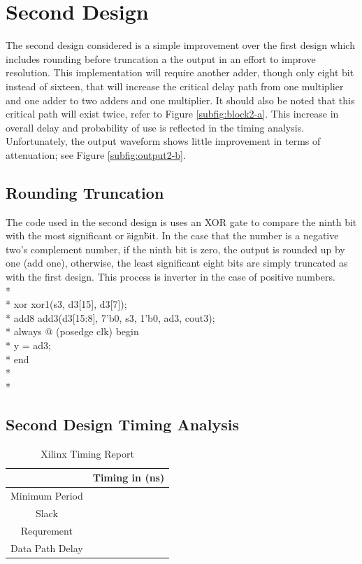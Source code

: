\section*{Second Design}
The second design considered is a simple improvement over the first design which includes rounding before truncation a the output in an effort to improve resolution. This implementation will require another adder, though only eight bit instead of sixteen, that will increase the critical delay path from one multiplier and one adder to two adders and one multiplier. It should also be noted that this critical path will exist twice, refer to Figure \ref{subfig:block2-a}. This increase in overall delay and probability of use is reflected in the timing analysis. Unfortunately, the output waveform shows little improvement in terms of attenuation; see Figure \ref{subfig:output2-b}.  

\subsection*{Rounding Truncation}
The code used in the second design is uses an XOR gate to compare the ninth bit with the most significant or \"sign\" bit. In the case that the number is a negative two's complement number, if the ninth bit is zero, the output is rounded up by one (add one), otherwise, the least significant eight bits are simply truncated as with the first design. This process is inverter in the case of positive numbers.  \\*
\\*
xor xor1(s3, d3[15], d3[7]);\\*
add8 add3(d3[15:8], {7'b0, s3}, 1'b0, ad3, cout3);\\*
always @ (posedge clk)
begin\\*
y = ad3;\\*
end\\*
\\*
\subsection*{Second Design Timing Analysis}

\begin{table}[bh]
\caption{Xilinx Timing Report}
\begin{tabular}{c|c}
\centering
           & Timing in (ns) \\
\hline
Minimum Period &     \\

     Slack &     \\

Requrement &        \\

Data Path Delay &     \\
\end{tabular}  
\label{tab:timing2}
\end{table}

